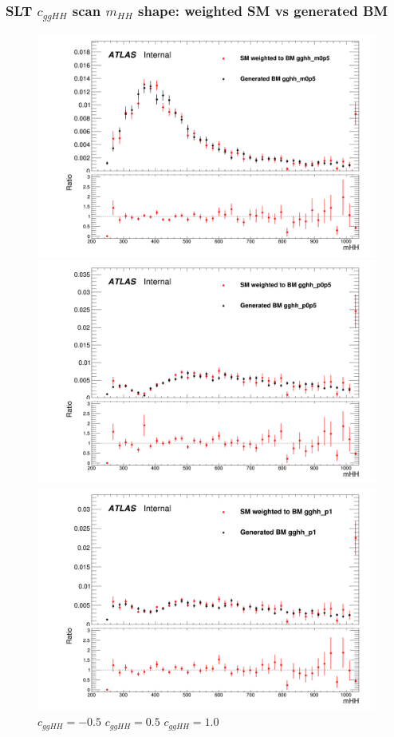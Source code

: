\documentclass[twoside,11pt]{beamer}
\begin{document}
\begin{frame}
    \frametitle{SLT $c_{ggHH}$ scan $m_{HH}$  shape: weighted SM vs generated BM}

    \begin{figure}
    \includegraphics[width=.32\textwidth]{figures/Method_B_all_latest/BMgghh_m0p5h_mHH.png}
    \includegraphics[width=.32\textwidth]{figures/Method_B_all_latest/BMgghh_p0p5h_mHH.png}
    \includegraphics[width=.32\textwidth]{figures/Method_B_all_latest/BMgghh_p1h_mHH.png}
    $c_{ggHH} = -0.5$ \hspace{5em} $c_{ggHH} = 0.5$\hspace{5em} $c_{ggHH} = 1.0$
    \end{figure}


\end{frame}     
\end{document}
